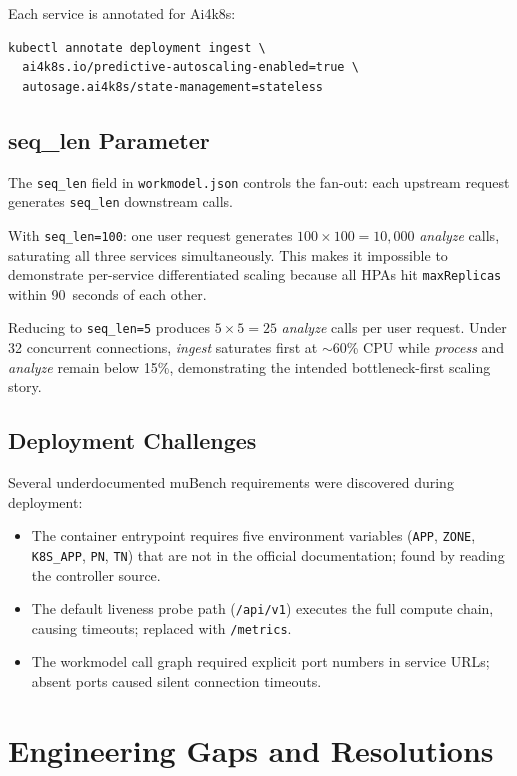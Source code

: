 Each service is annotated for Ai4k8s:
\begin{verbatim}
kubectl annotate deployment ingest \
  ai4k8s.io/predictive-autoscaling-enabled=true \
  autosage.ai4k8s/state-management=stateless
\end{verbatim}

\subsection{seq\_len Parameter}
\label{sec:seqlen}

The \texttt{seq\_len} field in \texttt{workmodel.json} controls the fan-out:
each upstream request generates \texttt{seq\_len} downstream calls.

With \texttt{seq\_len=100}: one user request generates $100 \times 100 = 10{,}000$
\textit{analyze} calls, saturating all three services simultaneously. This makes
it impossible to demonstrate per-service differentiated scaling because all HPAs
hit \texttt{maxReplicas} within 90~seconds of each other.

Reducing to \texttt{seq\_len=5} produces $5 \times 5 = 25$ \textit{analyze}
calls per user request. Under 32 concurrent connections, \textit{ingest} saturates
first at $\sim$60\% CPU while \textit{process} and \textit{analyze} remain below
15\%, demonstrating the intended bottleneck-first scaling story.

\subsection{Deployment Challenges}
Several underdocumented muBench requirements were discovered during deployment:
\begin{itemize}
  \item The container entrypoint requires five environment variables
  (\texttt{APP}, \texttt{ZONE}, \texttt{K8S\_APP}, \texttt{PN}, \texttt{TN})
  that are not in the official documentation; found by reading the controller source.
  \item The default liveness probe path (\texttt{/api/v1}) executes the full
  compute chain, causing timeouts; replaced with \texttt{/metrics}.
  \item The workmodel call graph required explicit port numbers in service URLs;
  absent ports caused silent connection timeouts.
\end{itemize}

\section{Engineering Gaps and Resolutions}
\label{sec:gaps}

